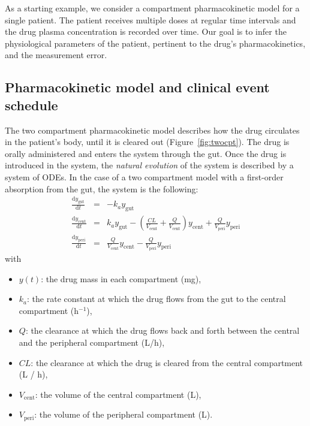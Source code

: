 
As a starting example, we consider a compartment pharmacokinetic model for a single patient.
The patient receives multiple doses at regular time intervals and the drug plasma concentration is recorded over time.
Our goal is to infer the physiological parameters of the patient, pertinent to the drug's pharmacokinetics, and the measurement error.

\subsection{Pharmacokinetic model and clinical event schedule} \label{sec:twocpt}

The two compartment pharmacokinetic model describes how the drug circulates in the patient's body, until it is cleared out (Figure~\ref{fig:twocpt}).
The drug is orally administered and enters the system through the gut.
Once the drug is introduced in the system, the \textit{natural evolution} of the system is described by a system of ODEs.
In the case of a two compartment model with a first-order absorption from the gut, the system is the following:
%
\begin{subequations}
\begin{eqnarray*}
  \frac{\mathrm d y_\mathrm{gut}}{\mathrm d t} & = & - k_a y_\mathrm{gut} \\ 
  \frac{\mathrm d y_\mathrm{cent}}{\mathrm d t} & = & k_a y_\mathrm{gut} - \left (\frac{CL}{V_\mathrm{cent}} + \frac{Q}{V_\mathrm{cent}} \right) y_\mathrm{cent} + \frac{Q}{V_\mathrm{peri}} y_\mathrm{peri} \\
  \frac{\mathrm d y_\mathrm{peri}}{\mathrm d t} & = & \frac{Q}{V_\mathrm{cent}} y_\mathrm{cent} - \frac{Q}{V_\mathrm{peri}} y_\mathrm{peri}
\end{eqnarray*}
\label{eq:twocpt}
\end{subequations}
%
with
\begin{itemize}
  \setlength\itemsep{0em}
  \item $y(t)$: the drug mass in each compartment (mg),
  \item $k_a$: the rate constant at which the drug flows from the gut to the central compartment (h$^{-1}$),
  \item $Q$: the clearance at which the drug flows back and forth between the central and the peripheral compartment (L/h),
  \item $CL$: the clearance at which the drug is cleared from the central compartment (L / h),
  \item $V_\mathrm{cent}$: the volume of the central compartment (L),
  \item $V_\mathrm{peri}$: the volume of the peripheral compartment (L).
\end{itemize}

